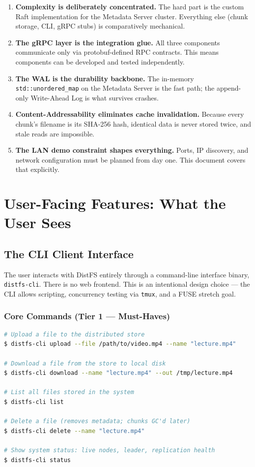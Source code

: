 \documentclass[12pt,a4paper]{article}
\begin{document}
\begin{enumerate}[leftmargin=2em]
  \item \textbf{Complexity is deliberately concentrated.} The hard part is the custom Raft implementation for the Metadata Server cluster. Everything else (chunk storage, CLI, gRPC stubs) is comparatively mechanical.
  \item \textbf{The gRPC layer is the integration glue.} All three components communicate only via protobuf-defined RPC contracts. This means components can be developed and tested independently.
  \item \textbf{The WAL is the durability backbone.} The in-memory \texttt{std::unordered\_map} on the Metadata Server is the fast path; the append-only Write-Ahead Log is what survives crashes.
  \item \textbf{Content-Addressability eliminates cache invalidation.} Because every chunk's filename is its SHA-256 hash, identical data is never stored twice, and stale reads are impossible.
  \item \textbf{The LAN demo constraint shapes everything.} Ports, IP discovery, and network configuration must be planned from day one. This document covers that explicitly.
\end{enumerate}

\section{User-Facing Features: What the User Sees}

\subsection{The CLI Client Interface}

The user interacts with DistFS entirely through a command-line interface binary, \texttt{distfs-cli}. There is no web frontend. This is an intentional design choice — the CLI allows scripting, concurrency testing via \texttt{tmux}, and a FUSE stretch goal.

\subsubsection{Core Commands (Tier 1 — Must-Haves)}

\begin{lstlisting}[language=bash, caption={distfs-cli core commands}]
# Upload a file to the distributed store
$ distfs-cli upload --file /path/to/video.mp4 --name "lecture.mp4"

# Download a file from the store to local disk
$ distfs-cli download --name "lecture.mp4" --out /tmp/lecture.mp4

# List all files stored in the system
$ distfs-cli list

# Delete a file (removes metadata; chunks GC'd later)
$ distfs-cli delete --name "lecture.mp4"

# Show system status: live nodes, leader, replication health
$ distfs-cli status
\end{lstlisting}
\end{document}
